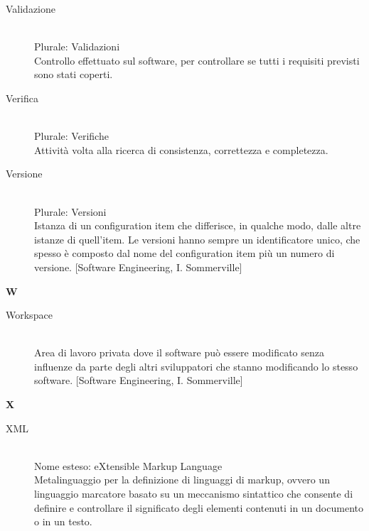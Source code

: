 \begin{description}\item[Validazione] \hfill \\
Plurale: Validazioni\\ 
Controllo effettuato sul software, per controllare se tutti i requisiti previsti sono stati coperti.
 \item[Verifica] \hfill \\
Plurale: Verifiche\\ 
Attività volta alla ricerca di consistenza, correttezza e completezza.
 \item[Versione] \hfill \\
Plurale: Versioni\\ 
Istanza di un configuration item che differisce, in
		qualche modo, dalle altre istanze di quell'item. Le versioni hanno
		sempre un identificatore unico, che spesso è composto dal nome del
		configuration item più un numero di versione. [Software Engineering, I. Sommerville]
 \end{description}
\newpage 
\begin{center}\textbf{\Huge{W}}\end{center}
\begin{description}\item[Workspace] \hfill \\
Area di lavoro privata dove il software può essere
		modificato senza influenze da parte degli altri sviluppatori che stanno modificando lo stesso software. [Software Engineering, I. Sommerville]
 \end{description}
\newpage 
\begin{center}\textbf{\Huge{X}}\end{center}
\begin{description}\item[XML] \hfill \\
Nome esteso: eXtensible Markup Language\\ 
Metalinguaggio per la definizione di linguaggi di markup, ovvero un linguaggio marcatore basato su un meccanismo sintattico che consente di definire e controllare il significato degli elementi contenuti in un documento o in un testo.
 \end{description}
